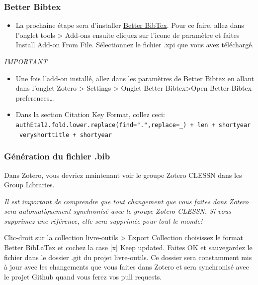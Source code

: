 \documentclass[
  letterpaper,
]{scrbook}
\providecommand{\tightlist}{%
  \setlength{\itemsep}{0pt}\setlength{\parskip}{0pt}}\usepackage{longtable,booktabs,array}
\begin{document}
\hypertarget{better-bibtex}{%
\subsubsection{Better Bibtex}\label{better-bibtex}}

\begin{itemize}
\tightlist
\item
  La prochaine étape sera d'installer
  \href{https://retorque.re/zotero-better-bibtex/installation/}{Better
  BibTex}. Pour ce faire, allez dans l'onglet tools \textgreater{}
  Add-ons ensuite cliquez sur l'icone de paramètre et faites Install
  Add-on From File. Sélectionnez le fichier .xpi que vous avez
  téléchargé.
\end{itemize}

\emph{IMPORTANT}

\begin{itemize}
\item
  Une fois l'add-on installé, allez dans les paramètres de Better Bibtex
  en allant dans l'onglet Zotero \textgreater{} Settings \textgreater{}
  Onglet Better Bibtex\textgreater Open Better Bibtex
  preferences\ldots{}
\item
  Dans la section Citation Key Format, collez ceci:
  \texttt{authEtal2.fold.lower.replace(find=".",replace=\_)\ +\ len\ +\ shortyear\ \textbar{}\ veryshorttitle\ +\ shortyear}
\end{itemize}

\hypertarget{guxe9nuxe9ration-du-fichier-.bib}{%
\subsubsection{Génération du fichier
.bib}\label{guxe9nuxe9ration-du-fichier-.bib}}

Dans Zotero, vous devriez maintenant voir le groupe Zotero CLESSN dans
les Group Libraries.

\emph{Il est important de comprendre que tout changement que vous faites
dans Zotero sera automatiquement synchronisé avec le groupe Zotero
CLESSN. Si vous supprimez une référence, elle sera supprimée pour tout
le monde!}

Clic-droit sur la collection livre-outils \textgreater{} Export
Collection choisissez le format Better BibLaTex et cochez la case
{[}x{]} Keep updated. Faites OK et sauvegardez le fichier dans le
dossier .git du projet livre-outils. Ce dossier sera constamment mis à
jour avec les changements que vous faites dans Zotero et sera
synchronisé avec le projet Github quand vous ferez vos pull requests.
\end{document}
